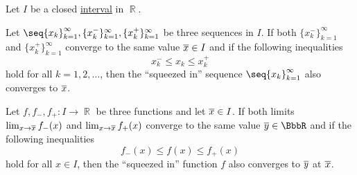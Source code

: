 \begin{lemma}\label{thm:squeeze_lemma}
  Let \( I \) be a closed \hyperref[def:order_interval/closed]{interval} in \( \BbbR \).

  \begin{thmenum}
     Let \( \seq{ x_k }_{k=1}^\infty, \{ x_k^- \}_{k=1}^\infty, \{ x_k^+ \}_{k=1}^\infty \) be three sequences in \( I \). If both \( \{ x_k^- \}_{k=1}^\infty \) and \( \{ x_k^+ \}_{k=1}^\infty \) converge to the same value \( \oline x \in I \) and if the following inequalities
    \begin{equation*}
      x_k^- \leq x_k \leq x_k^+
    \end{equation*}
    hold for all \( k = 1, 2, \ldots \), then the \enquote{squeezed in} sequence \( \seq{ x_k }_{k=1}^\infty \) also converges to \( \oline x \).

     Let \( f, f_-, f_+: I \to \BbbR \) be three functions and let \( \oline x \in I \). If both limits \( \lim_{x \to \oline x} f_-(x) \) and \( \lim_{x \to \oline x} f_+(x) \) converge to the same value \( \oline y \in \BbbR \) and if the following inequalities
    \begin{equation*}
      f_-(x) \leq f(x) \leq f_+(x)
    \end{equation*}
    hold for all \( x \in I \), then the \enquote{squeezed in} function \( f \) also converges to \( \oline y \) at \( \oline x \).
  \end{thmenum}
\end{lemma}
